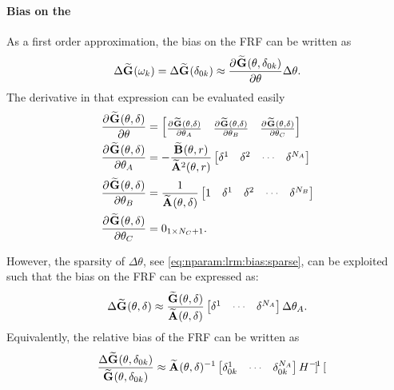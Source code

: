 \paragraph{Bias on the }
As a first order approximation, the bias on the \gls{FRF} can be written as
\begin{equation}
  \Delta \mathbf{\widetilde{G}}_{} (\omega_k) 
  =
  \Delta \mathbf{\widetilde{G}}_{} (\delta_{0k}) 
     \approx 
        \frac{{\partial}^{} \mathbf{\widetilde{G}}_{} (\theta, \delta_{0k})}{\partial \theta} 
      \Delta \theta
      \text{.}
\end{equation}
The derivative in that expression can be evaluated easily
\begin{align}
    \PartialDerivative{\LocalModel{G}(\theta, \dW)}{\theta} 
     &=
     \begin{bmatrix}
       \PartialDerivative{\LocalModel{G}(\theta,\dW)}{\theta_A} &
       \PartialDerivative{\LocalModel{G}(\theta,\dW)}{\theta_B} &
       \PartialDerivative{\LocalModel{G}(\theta,\dW)}{\theta_C} 
     \end{bmatrix}
     \\
     \PartialDerivative{\LocalModel{G}(\theta, \dW)}{\theta_A} 
     &=
     - \frac{\LocalModel{B}(\theta, r)}{\LocalModel{A}^2(\theta, r)}
     \begin{bmatrix}
         \dW^1 & \dW^2 & \deemph{\cdots} & \dW^{\order{A}}
     \end{bmatrix}
     \\
     \PartialDerivative{\LocalModel{G}(\theta, \dW)}{\theta_B} 
     &=
     \frac{1}{\LocalModel{A}(\theta, \dW)}
     \begin{bmatrix}
         1 & \dW^1 & \dW^2 & \deemph{\cdots} & \dW^{\order{B}}
     \end{bmatrix}
     \\
     \PartialDerivative{\LocalModel{G}(\theta, \dW)}{\theta_C} 
     &=
     \Zero{1 \times \order{C}+1}
     \text{.}
\end{align}

However, the sparsity of $\Delta\theta$, see \eqref{eq:nparam:lrm:bias:sparse}, can be exploited such that the bias on the \gls{FRF} can be expressed as:
\begin{equation}
  \Delta \LocalModel{G}(\theta,\dW)
  \approx
  \frac{\LocalModel{G}(\theta, \dW)}
           {\LocalModel{A}(\theta, \dW)}
  \begin{bmatrix}
    \dW^1 & \deemph{\cdots} & \dW^{\order{A}}
  \end{bmatrix}
  \Delta \theta_A
  \text{.}
\end{equation}
Equivalently, the relative bias of the \gls{FRF} can be written as
\begin{equation}
\frac{\Delta \LocalModel{G}(\theta,\dw{0}{k})}{\LocalModel{G}(\theta,\dw{0}{k})}
\approx
\LocalModel{A}(\theta,\dW)^{-1}
\begin{bmatrix}
    \dw{0}{k}^1 & \deemph{\cdots} & \dw{0}{k}^{\order{A}}
  \end{bmatrix}
  H^{-1}
  \begin{bmatrix}
  
  \end{bmatrix}
\end{equation}

